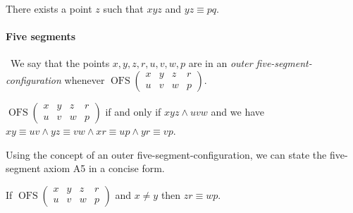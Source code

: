 \documentclass[10pt,a4paper,parskip=half,numbers=endperiod,headings=standardclasses,parskip]{scrbook}
\newcommand{\Cong}[4]{#1 #2 \equiv #3 #4}
\newcommand{\Betw}[3]{#1 #2 #3}
\newcommand{\OFS}[8]{\operatorname{OFS}
\left(\begin{smallmatrix}%
#1 & #2 & #3 & #4 \\
#5 & #6 & #7 & #8
\end{smallmatrix}\right)%
}
\begin{document}
  \begin{forthel}
    \begin{axiom}[A4]
      There exists a point $z$ such that $\Betw{x}{y}{z}$ and $\Cong{y}{z}{p}{q}$.
    \end{axiom}
  \end{forthel}


  \paragraph{Five segments}\
  We say that the points $x,y,z,r,u,v,w,p$ are in an \textit{outer five-segment-configuration}
  whenever $\OFS{x}{y}{z}{r}{u}{v}{w}{p}$.

  \begin{forthel}
    \begin{definition}
      $\OFS{x}{y}{z}{r}{u}{v}{w}{p}$ if and only if
      $\Betw{x}{y}{z}
        \wedge \Betw{u}{v}{w}$
      and we have
      $\Cong{x}{y}{u}{v}
        \wedge \Cong{y}{z}{v}{w}
        \wedge \Cong{x}{r}{u}{p}
        \wedge \Cong{y}{r}{v}{p}$.
    \end{definition}
  \end{forthel}

  Using the concept of an outer five-segment-configuration,
  we can state the five-segment axiom A5 in a concise form.


  \begin{forthel}
    \begin{axiom}[A5]
      If $\OFS{x}{y}{z}{r}{u}{v}{w}{p}$ and $x \neq y$ then $\Cong{z}{r}{w}{p}$.
    \end{axiom}
  \end{forthel}
\end{document}
